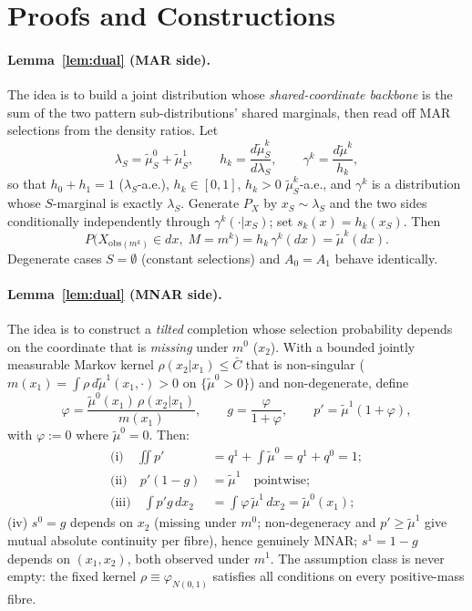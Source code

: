 \documentclass[conference]{IEEEtran}
\begin{document}
\section{Proofs and Constructions}
\label{sec:proofs}

\paragraph{Lemma~\ref{lem:dual} (MAR side).}
The idea is to build a joint distribution whose \emph{shared-coordinate backbone} is the sum
of the two pattern sub-distributions' shared marginals, then read off MAR selections from
the density ratios. Let
\begin{equation}
\lambda_S=\tilde\mu^0_S+\tilde\mu^1_S,\qquad
h_k=\frac{d\tilde\mu^k_S}{d\lambda_S},\qquad
\gamma^k=\frac{d\tilde\mu^k}{h_k},
\label{eq:proof_mar_defs}
\end{equation}
so that $h_0+h_1=1$ ($\lambda_S$-a.e.), $h_k\in[0,1]$, $h_k>0$ $\tilde\mu^k_S$-a.e., and
$\gamma^k$ is a distribution whose $S$-marginal is exactly $\lambda_S$. Generate $P_X$ by
$x_S\sim\lambda_S$ and the two sides conditionally independently through
$\gamma^k(\cdot|x_S)$; set $s_k(x)=h_k(x_S)$. Then
\begin{equation}
P\bigl(X_{\mathrm{obs}(m^k)}\in dx,\; M=m^k\bigr)
= h_k\,\gamma^k(dx) = \tilde\mu^k(dx).
\label{eq:proof_mar_verify}
\end{equation}
Degenerate cases $S=\emptyset$ (constant selections) and $A_0=A_1$ behave identically.

\paragraph{Lemma~\ref{lem:dual} (MNAR side).}
The idea is to construct a \emph{tilted} completion whose selection probability depends
on the coordinate that is \emph{missing} under $m^0$ ($x_2$). With a bounded jointly
measurable Markov kernel $\rho(x_2|x_1)\le\bar C$ that is non-singular
($m(x_1)=\int\rho\,d\tilde\mu^1(x_1,\cdot)>0$ on $\{\tilde\mu^0>0\}$) and non-degenerate,
define
\begin{equation}
\varphi=\frac{\tilde\mu^0(x_1)\,\rho(x_2|x_1)}{m(x_1)},\qquad
g=\frac{\varphi}{1+\varphi},\qquad
p'=\tilde\mu^1(1+\varphi),
\label{eq:proof_mnar_defs}
\end{equation}
with $\varphi:=0$ where $\tilde\mu^0=0$. Then:
\begin{align}
\text{(i)}\quad \iint p' &= q^1 + \int\tilde\mu^0 = q^1+q^0 = 1; \label{eq:proof_mnar_i}\\
\text{(ii)}\quad p'(1-g) &= \tilde\mu^1 \quad\text{pointwise}; \label{eq:proof_mnar_ii}\\
\text{(iii)}\quad \int p'g\,dx_2 &= \int\varphi\,\tilde\mu^1\,dx_2 = \tilde\mu^0(x_1); \label{eq:proof_mnar_iii}
\end{align}
(iv) $s^0=g$ depends on $x_2$ (missing under $m^0$; non-degeneracy and
$p'\ge\tilde\mu^1$ give mutual absolute continuity per fibre), hence genuinely MNAR;
$s^1=1-g$ depends on $(x_1,x_2)$, both observed under $m^1$.
The assumption class is never empty: the fixed kernel $\rho\equiv\varphi_{N(0,1)}$
satisfies all conditions on every positive-mass fibre.
\end{document}
